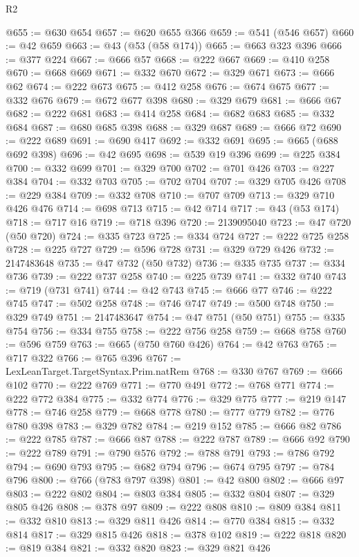 \begin{lexlean}{R2}
\begin{coremodule}
@655 := @630 @654
@657 := @620 @655 @366
@659 := @541 (@546 @657)
@660 := @42 @659
@663 := @43 (@53 (@58 @174))
@665 := @663 @323 @396
@666 := @377 @224
@667 := @666 @57
@668 := @222 @667
@669 := @410 @258
@670 := @668 @669
@671 := @332 @670
@672 := @329 @671
@673 := @666 @62
@674 := @222 @673
@675 := @412 @258
@676 := @674 @675
@677 := @332 @676
@679 := @672 @677 @398
@680 := @329 @679
@681 := @666 @67
@682 := @222 @681
@683 := @414 @258
@684 := @682 @683
@685 := @332 @684
@687 := @680 @685 @398
@688 := @329 @687
@689 := @666 @72
@690 := @222 @689
@691 := @690 @417
@692 := @332 @691
@695 := @665 (@688 @692 @398)
@696 := @42 @695
@698 := @539 @19 @396
@699 := @225 @384
@700 := @332 @699
@701 := @329 @700
@702 := @701 @426
@703 := @227 @384
@704 := @332 @703
@705 := @702 @704
@707 := @329 @705 @426
@708 := @229 @384
@709 := @332 @708
@710 := @707 @709
@713 := @329 @710 @426 @476
@714 := @698 @713
@715 := @42 @714
@717 := @43 (@53 @174)
@718 := @717 @16
@719 := @718 @396
@720 := 2139095040
@723 := @47 @720 (@50 @720)
@724 := @335 @723
@725 := @334 @724
@727 := @222 @725 @258
@728 := @225 @727
@729 := @596 @728
@731 := @329 @729 @426
@732 := 2147483648
@735 := @47 @732 (@50 @732)
@736 := @335 @735
@737 := @334 @736
@739 := @222 @737 @258
@740 := @225 @739
@741 := @332 @740
@743 := @719 (@731 @741)
@744 := @42 @743
@745 := @666 @77
@746 := @222 @745
@747 := @502 @258
@748 := @746 @747
@749 := @500 @748
@750 := @329 @749
@751 := 2147483647
@754 := @47 @751 (@50 @751)
@755 := @335 @754
@756 := @334 @755
@758 := @222 @756 @258
@759 := @668 @758
@760 := @596 @759
@763 := @665 (@750 @760 @426)
@764 := @42 @763
@765 := @717 @322
@766 := @765 @396
@767 := LexLeanTarget.TargetSyntax.Prim.natRem
@768 := @330 @767
@769 := @666 @102
@770 := @222 @769
@771 := @770 @491
@772 := @768 @771
@774 := @222 @772 @384
@775 := @332 @774
@776 := @329 @775
@777 := @219 @147
@778 := @746 @258
@779 := @668 @778
@780 := @777 @779
@782 := @776 @780 @398
@783 := @329 @782
@784 := @219 @152
@785 := @666 @82
@786 := @222 @785
@787 := @666 @87
@788 := @222 @787
@789 := @666 @92
@790 := @222 @789
@791 := @790 @576
@792 := @788 @791
@793 := @786 @792
@794 := @690 @793
@795 := @682 @794
@796 := @674 @795
@797 := @784 @796
@800 := @766 (@783 @797 @398)
@801 := @42 @800
@802 := @666 @97
@803 := @222 @802
@804 := @803 @384
@805 := @332 @804
@807 := @329 @805 @426
@808 := @378 @97
@809 := @222 @808
@810 := @809 @384
@811 := @332 @810
@813 := @329 @811 @426
@814 := @770 @384
@815 := @332 @814
@817 := @329 @815 @426
@818 := @378 @102
@819 := @222 @818
@820 := @819 @384
@821 := @332 @820
@823 := @329 @821 @426

\end{coremodule}
\end{lexlean}

